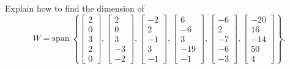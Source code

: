 \documentclass{article}
\begin{document}
\begin{exerciseStatement}
    Explain how to find the dimension of
\[W=\mathrm{span}\ \left\{\left[\begin{array}{r}
2 \\
0 \\
3 \\
2 \\
0
\end{array}\right] , \left[\begin{array}{r}
2 \\
0 \\
3 \\
-3 \\
-2
\end{array}\right] , \left[\begin{array}{r}
-2 \\
2 \\
-1 \\
3 \\
-1
\end{array}\right] , \left[\begin{array}{r}
6 \\
-6 \\
3 \\
-19 \\
-1
\end{array}\right] , \left[\begin{array}{r}
-6 \\
2 \\
-7 \\
-6 \\
-3
\end{array}\right] , \left[\begin{array}{r}
-20 \\
16 \\
-14 \\
50 \\
4
\end{array}\right]\right\}.\]



  
\end{exerciseStatement}
\end{document}
